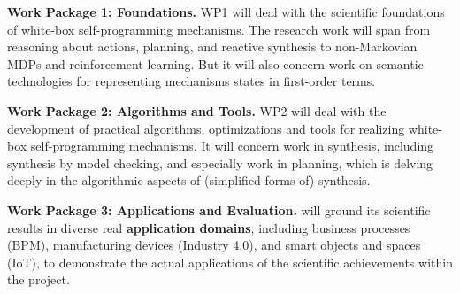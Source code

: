 \textbf{Work Package 1: Foundations.} WP1 will deal with the
scientific foundations of white-box self-programming mechanisms. The
research work will span from reasoning about actions, planning, and
reactive synthesis to non-Markovian MDPs and reinforcement
learning. But it will also concern work on semantic technologies for
representing mechanisms states in first-order terms.



\textbf{Work Package 2: Algorithms and Tools.}  WP2 will deal with the
development of practical algorithms, optimizations and tools for realizing
white-box self-programming mechanisms. It will concern work in synthesis, including
synthesis by model checking, and especially work in planning, which is
delving deeply in the algorithmic aspects of (simplified forms of)
synthesis.

\textbf{Work Package 3: Applications and Evaluation.}  \project will
ground its scientific results in diverse real \textbf{application
  domains}, including business processes (BPM), manufacturing devices
(Industry 4.0), and smart objects and spaces (IoT), to demonstrate the
actual applications of the scientific achievements within the project.


